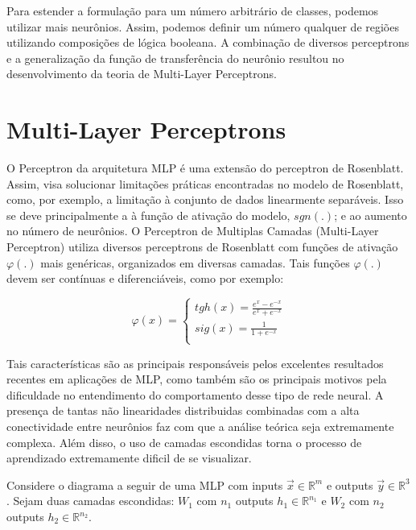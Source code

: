 \documentclass[
	12pt,				%
	oneside,			%
	a4paper,			%
	english,			%
	french,				%
	spanish,			%
	brazil,				%
	]{abntex2}
\begin{document}
Para estender a formula\c{c}\~ao para um n\'umero arbitr\'ario de classes, podemos utilizar mais neur\^onios. Assim, podemos definir um n\'umero qualquer de regi\~oes utilizando composi\c{c}\~oes de l\'ogica booleana. A combinação de diversos perceptrons e a generalização da função de transferência do neurônio resultou no desenvolvimento da teoria de Multi-Layer Perceptrons.

\section{Multi-Layer Perceptrons}
O Perceptron da arquitetura MLP \'e uma extens\~ao do perceptron de Rosenblatt. Assim, visa solucionar limita\c{c}\~oes pr\'aticas encontradas no modelo de Rosenblatt, como, por exemplo, a limita\c{c}\~ao \`a conjunto de dados linearmente separ\'aveis. Isso se deve principalmente a \`a fun\c{c}\~ao de ativa\c{c}\~ao do modelo, $sgn(.)$; e ao aumento no n\'umero de neur\^onios. O Perceptron de Multiplas Camadas (Multi-Layer Perceptron) utiliza diversos perceptrons de Rosenblatt com fun\c{c}\~oes de ativa\c{c}\~ao $\varphi(.)$ mais gen\'ericas, organizados em diversas camadas. Tais fun\c{c}\~oes $\varphi(.)$ devem ser cont\'inuas e diferenci\'aveis, como por exemplo:

$$\varphi(x) = \begin{cases}
tgh(x) = \frac{ e^x - e^{-x} } {e^x + e^{-x}} \\
sig(x) = \frac{ 1 } {1 + e^{-x}} \\

\end{cases} $$

Tais caracter\'isticas s\~ao as principais respons\'aveis pelos excelentes resultados recentes em aplica\c{c}\~oes de MLP, como tamb\'em s\~ao os principais motivos pela dificuldade no entendimento do comportamento desse tipo de rede neural. A presen\c{c}a de tantas n\~ao linearidades distribuidas combinadas com a alta conectividade entre neur\^onios faz com que a an\'alise te\'orica seja extremamente complexa. Al\'em disso, o uso de camadas escondidas torna o processo de aprendizado extremamente dificil de se visualizar.

Considere o diagrama a seguir de uma MLP com inputs $\vec{x} \in \mathbb{R}^m$ e outputs $\vec{y} \in \mathbb{R}^3$. Sejam duas camadas escondidas: $W_1$ com $n_1$ outputs $h_1 \in \mathbb{R}^{n_1}$ e $W_2$ com $n_2$ outputs $h_2 \in \mathbb{R}^{n_2}$.
\end{document}
